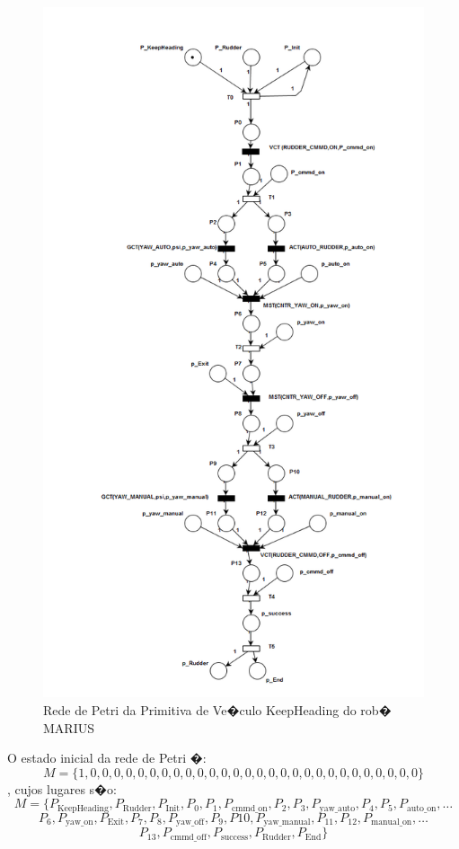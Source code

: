 \begin{figure}[H]
\centering
\includegraphics[width=0.87\columnwidth]{figs/SILVA_3.png}
\caption{Rede de Petri da Primitiva de Ve�culo KeepHeading do rob� MARIUS}
\label{SILVA_3}
\end{figure}

O estado inicial da rede de Petri �: $$M
=\{1,0,0,0,0,0,0,0,0,0,0,0,0,0,0,0,0,0,0,0,0,0,0,0,0,0,0,0,0\}$$, cujos lugares
s�o:
$$M
=\{P_{\textrm{KeepHeading}},P_{\textrm{Rudder}},P_{\textrm{Init}},P_0,P_1,P_{\textrm{cmmd\_on}},P_2,P_3,P_{\textrm{yaw\_auto}},P_4,P_5,P_{\textrm{auto\_on}},\ldots$$
$$P_6,P_{\textrm{yaw\_on}},P_{\textrm{Exit}},P_7,P_8,P_{\textrm{yaw\_off}},P_9,P{10},P_{\textrm{yaw\_manual}},P_{11},P_{12},P_{\textrm{manual\_on}},\ldots$$
$$P_{13},P_{\textrm{cmmd\_off}},P_{\textrm{success}},P_{\textrm{Rudder}},P_{\textrm{End}}\}$$

